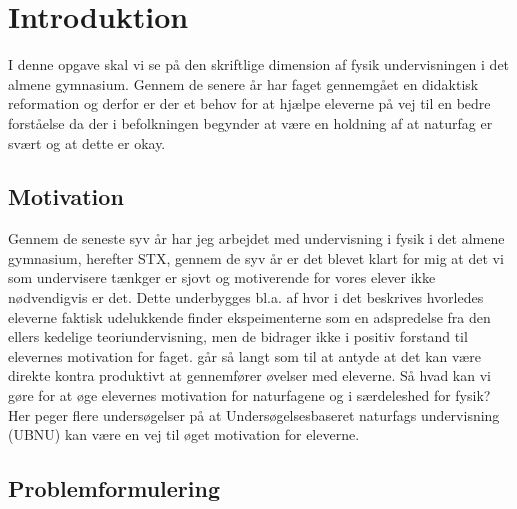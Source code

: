 \chapter{Introduktion}
\label{Ch:1}

I denne opgave skal vi se på den skriftlige dimension af fysik undervisningen i det almene gymnasium. Gennem de senere år har faget gennemgået en didaktisk reformation og derfor er der et behov for at hjælpe eleverne på vej til en bedre forståelse da der i befolkningen begynder at være en holdning af at naturfag er svært og at dette er okay. 

\section{Motivation}
\label{sec:1.1}
Gennem de seneste syv år har jeg arbejdet med undervisning i fysik i det almene gymnasium, herefter STX, gennem de syv år er det blevet klart for mig at det vi som undervisere tænkger er sjovt og motiverende for vores elever ikke nødvendigvis er det. Dette underbygges bl.a. af \citep{Hodson2008} hvor i det beskrives hvorledes eleverne faktisk udelukkende finder ekspeimenterne som en adspredelse fra den ellers kedelige teoriundervisning, men de bidrager ikke i positiv forstand til elevernes motivation for faget.  \citet[]{Hodson2008} går så langt som til at antyde at det kan være direkte kontra produktivt at gennemfører øvelser med eleverne. Så hvad kan vi gøre for at øge elevernes motivation for naturfagene og i særdeleshed for fysik? Her peger flere undersøgelser på at Undersøgelsesbaseret naturfags undervisning (UBNU) kan være en vej til øget motivation \citep{Krogh2016, Dolin2014} for eleverne.


\section{Problemformulering}
\label{sec:1.2}

\lipsum*
